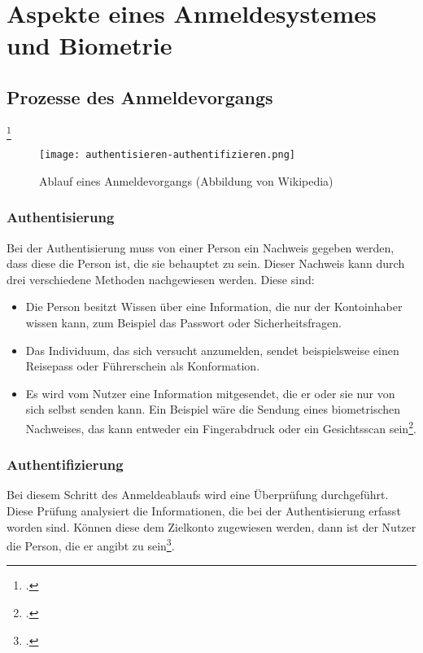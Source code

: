 \chapter{Aspekte eines Anmeldesystemes und Biometrie}
\strahlhofer

\section{Prozesse des Anmeldevorgangs}\footcite{authentifizierung}
\begin{center}
\begin{figure}[h]
    \centering
    \texttt{[image: authentisieren-authentifizieren.png]}
    \caption{Ablauf eines Anmeldevorgangs (Abbildung von Wikipedia)}
\end{figure}
\end{center}

\subsection{Authentisierung} 
Bei der Authentisierung muss von einer Person ein Nachweis gegeben werden, dass diese die Person ist, die sie behauptet zu sein. Dieser Nachweis kann durch drei verschiedene Methoden nachgewiesen werden. Diese sind:
\begin{itemize}
	\item Die Person besitzt Wissen über eine Information, die nur der Kontoinhaber wissen kann, zum Beispiel das Passwort oder Sicherheitsfragen.
	\item Das Individuum, das sich versucht anzumelden, sendet beispielsweise einen Reisepass oder Führerschein als Konformation.
	\item Es wird vom Nutzer eine Information mitgesendet, die er oder sie nur von sich selbst senden kann. Ein Beispiel wäre die Sendung eines biometrischen Nachweises, das kann entweder ein Fingerabdruck oder ein Gesichtsscan sein\footcite{anmeldevorgangs}.
\end{itemize}


\subsection{Authentifizierung}
Bei diesem Schritt des Anmeldeablaufs wird eine Überprüfung durchgeführt. Diese Prüfung analysiert die Informationen, die bei der Authentisierung erfasst worden sind. Können diese dem Zielkonto zugewiesen werden, dann ist der Nutzer die Person, die er angibt zu sein\footcite{anmeldevorgangs}.



